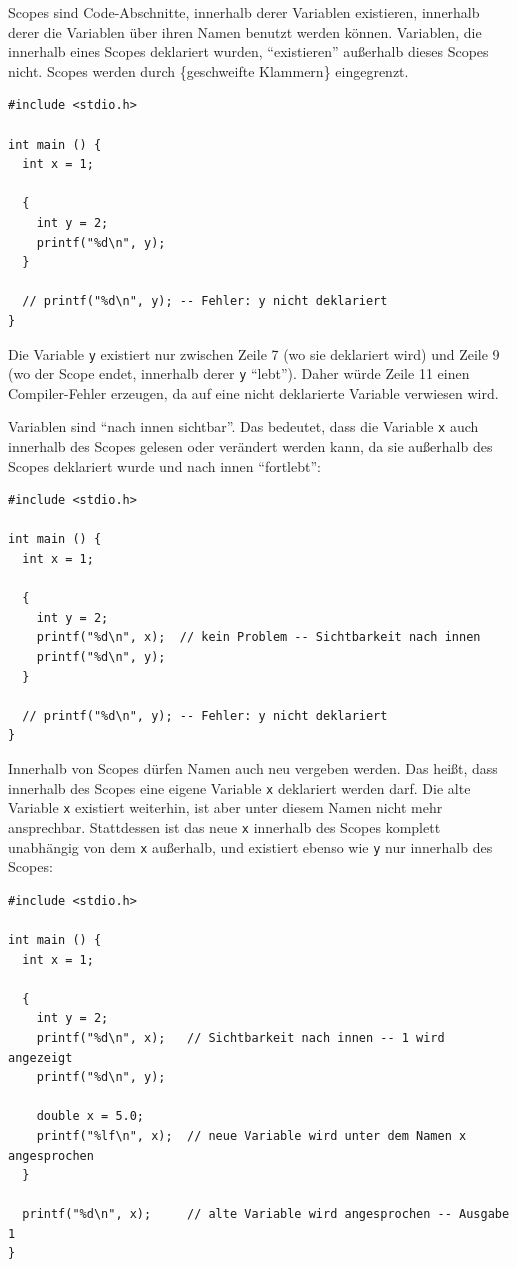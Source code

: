 Scopes sind Code-Abschnitte, innerhalb derer Variablen existieren, \ie innerhalb derer die Variablen über ihren Namen benutzt werden können. Variablen, die innerhalb eines Scopes deklariert wurden, \enquote{existieren} außerhalb dieses Scopes nicht. Scopes werden durch \{geschweifte Klammern\} eingegrenzt.

\begin{codebox}
\begin{verbatim}
#include <stdio.h>

int main () {
  int x = 1;

  {
    int y = 2;
    printf("%d\n", y);
  }

  // printf("%d\n", y); -- Fehler: y nicht deklariert
}
\end{verbatim}
\end{codebox}

Die Variable \texttt{y} existiert nur zwischen Zeile 7 (wo sie deklariert wird) und Zeile 9 (wo der Scope endet, innerhalb derer \texttt{y} \enquote{lebt}). Daher würde Zeile 11 einen Compiler-Fehler erzeugen, da auf eine nicht deklarierte Variable verwiesen wird.

Variablen sind \enquote{nach innen sichtbar}. Das bedeutet, dass die Variable \texttt{x} auch innerhalb des Scopes gelesen oder verändert werden kann, da sie außerhalb des Scopes deklariert wurde und nach innen \enquote{fortlebt}:

\begin{codebox}
\begin{verbatim}
#include <stdio.h>

int main () {
  int x = 1;

  {
    int y = 2;
    printf("%d\n", x);  // kein Problem -- Sichtbarkeit nach innen
    printf("%d\n", y);
  }

  // printf("%d\n", y); -- Fehler: y nicht deklariert
}
\end{verbatim}
\end{codebox}

Innerhalb von Scopes dürfen Namen auch neu vergeben werden. Das heißt, dass innerhalb des Scopes eine eigene Variable \texttt{x} deklariert werden darf. Die alte Variable \texttt{x} existiert weiterhin, ist aber unter diesem Namen nicht mehr ansprechbar. Stattdessen ist das neue \texttt{x} innerhalb des Scopes komplett unabhängig von dem \texttt{x} außerhalb, und existiert ebenso wie \texttt{y} nur innerhalb des Scopes:

\begin{codebox}
\begin{verbatim}
#include <stdio.h>

int main () {
  int x = 1;

  {
    int y = 2;
    printf("%d\n", x);   // Sichtbarkeit nach innen -- 1 wird angezeigt
    printf("%d\n", y);

    double x = 5.0;
    printf("%lf\n", x);  // neue Variable wird unter dem Namen x angesprochen
  }

  printf("%d\n", x);     // alte Variable wird angesprochen -- Ausgabe 1
}
\end{verbatim}
\end{codebox}

